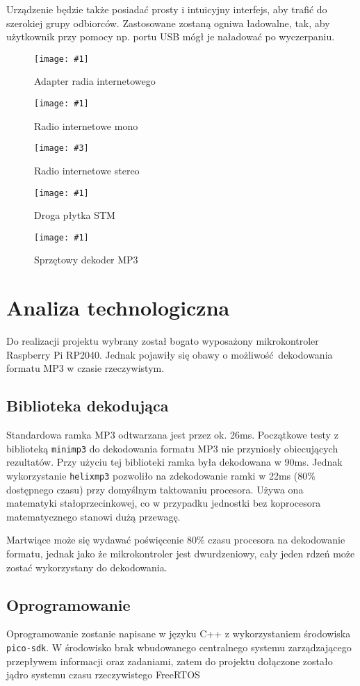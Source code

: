 \documentclass[12pt]{report}
\newcommand{\imgint}[4]{
	\begin{figure}[{#4}]
		\centering
		\texttt{[image: \#1]}
		\caption{#2}
		\label{#1}
	\end{figure}
}
\newcommand{\imgcs}[3]{\imgint{#1}{#2}{#3}{}}
\newcommand{\img}[2]{\imgcs{#1}{#2}{0.7}}
\newcommand{\imgintss}[5]{
	\begin{figure}[{#5}]
		\centering
		\begin{minipage}{.45\textwidth}
			\centering
			\texttt{[image: \#1]}
			\caption{#2}
			\label{#1}
		\end{minipage}%
		\hfill
		\begin{minipage}{.45\textwidth}
			\centering
			\texttt{[image: \#3]}
			\caption{#4}
			\label{#3}
		\end{minipage}
	\end{figure}
}
\newcommand{\imgss}[4]{\imgintss{#1}{#2}{#3}{#4}{}}
\begin{document}
		Urządzenie będzie także posiadać prosty i intuicyjny interfejs, aby trafić do szerokiej grupy odbiorców. Zastosowane zostaną ogniwa ładowalne, tak, aby użytkownik przy pomocy np. portu USB mógł je naładować po wyczerpaniu.
		
		\img{1/radio_adapter}{Adapter radia internetowego \textsuperscript{\cite{radio_adapter}}}
		\imgss{1/radio_tanie}{Radio internetowe mono \textsuperscript{\cite{radio_tanie}}}{1/radio_drogie}{Radio internetowe stereo \textsuperscript{\cite{radio_drogie}}}
		
		\img{1/botland_stm}{Droga płytka STM\textsuperscript{\cite{botland_stm}}}
		
		\img{1/radio_mp3}{Sprzętowy dekoder MP3 \textsuperscript{\cite{radio_vs1003}}}
		
	\section{Analiza technologiczna}
		Do realizacji projektu wybrany został bogato wyposażony mikrokontroler Raspberry Pi RP2040\textsuperscript{\cite{rp2040}}. Jednak pojawiły się obawy o możliwość dekodowania formatu MP3 w czasie rzeczywistym.
		
		\subsection{Biblioteka dekodująca}
			Standardowa ramka MP3 odtwarzana jest przez ok. 26ms. Początkowe testy z biblioteką \lstinline|minimp3|\textsuperscript{\cite{minimp3}} do dekodowania formatu MP3 nie przyniosły obiecujących rezultatów.  Przy użyciu tej biblioteki ramka była dekodowana w 90ms. Jednak wykorzystanie \lstinline|helixmp3|\textsuperscript{\cite{helixmp3}} pozwoliło na zdekodowanie ramki w 22ms (80\% dostępnego czasu) przy domyślnym taktowaniu procesora.  Używa ona matematyki stałoprzecinkowej, co w przypadku jednostki bez koprocesora matematycznego stanowi dużą przewagę.
			
			Martwiące może się wydawać poświęcenie 80\% czasu procesora na dekodowanie formatu, jednak jako że mikrokontroler jest dwurdzeniowy, cały jeden rdzeń może zostać wykorzystany do dekodowania.
		
		\subsection{Oprogramowanie}
			Oprogramowanie zostanie napisane w języku C++ z wykorzystaniem środowiska \lstinline|pico-sdk|\textsuperscript{\cite{pico_sdk}}.  W środowisko brak wbudowanego centralnego systemu zarządzającego przepływem informacji oraz zadaniami, zatem do projektu dołączone zostało jądro systemu czasu rzeczywistego FreeRTOS\textsuperscript{\cite{freertos_kernel}}
	
\end{document}
